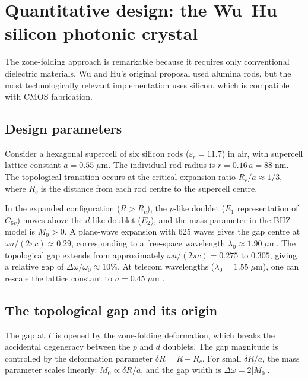 \section{Quantitative design: the Wu--Hu silicon photonic crystal}
\label{sec:ch11-quantitative}

The zone-folding approach is remarkable because it requires only
conventional dielectric materials.  Wu and Hu's original proposal
used alumina rods, but the most technologically relevant
implementation uses silicon, which is compatible with CMOS fabrication.

\subsection{Design parameters}
\label{sec:ch11-design-params}

Consider a hexagonal supercell of six silicon rods
($\varepsilon_r=11.7$) in air, with supercell lattice constant
$a=0.55\;\mu\mathrm{m}$.  The individual rod radius is
$r=0.16\,a=88\;\mathrm{nm}$.  The topological transition occurs at
the critical expansion ratio $R_c/a\approx 1/3$, where $R_c$ is the
distance from each rod centre to the supercell centre.

In the expanded configuration ($R>R_c$), the $p$-like doublet
($E_1$ representation of $C_{6v}$) moves above the $d$-like doublet
($E_2$), and the mass parameter in the BHZ model is $M_0>0$.  A
plane-wave expansion with 625 waves gives the gap centre at
$\omega a/(2\pi c)\approx 0.29$, corresponding to a free-space
wavelength $\lambda_0\approx 1.90\;\mu\mathrm{m}$.  The topological
gap extends from approximately $\omega a/(2\pi c)=0.275$ to $0.305$,
giving a relative gap of $\Delta\omega/\omega_0\approx 10\%$.
At telecom wavelengths ($\lambda_0=1.55\;\mu\mathrm{m}$), one can
rescale the lattice constant to $a=0.45\;\mu\mathrm{m}$
\cite{ozawa2018topological,ma2016all}.

\subsection{The topological gap and its origin}
\label{sec:ch11-gap-origin}

The gap at $\Gamma$ is opened by the zone-folding deformation, which
breaks the accidental degeneracy between the $p$ and $d$ doublets.
The gap magnitude is controlled by the deformation parameter
$\delta R = R-R_c$.  For small $\delta R/a$, the mass parameter scales
linearly: $M_0\propto\delta R/a$, and the gap width is
$\Delta\omega=2|M_0|$.


